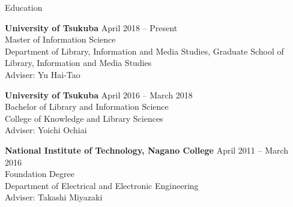 \documentclass{resume} %
\begin{document}

\begin{rSection}{Education}

    {\bf University of Tsukuba} \hfill {April 2018 -- Present}
    \\ Master of Information Science
    \\ Department of Library, Information and Media Studies, Graduate School of Library, Information and Media Studies
    \\ Adviser: Yu Hai-Tao

    {\bf University of Tsukuba} \hfill {April 2016 -- March 2018}
    \\ Bachelor of Library and Information Science
    \\ College of Knowledge and Library Sciences
    \\ Adviser: Yoichi Ochiai

    {\bf National Institute of Technology, Nagano College} \hfill {April 2011 -- March 2016}
    \\ Foundation Degree
    \\ Department of Electrical and Electronic Engineering
    \\ Adviser: Takashi Miyazaki

\end{rSection}

\end{document}
